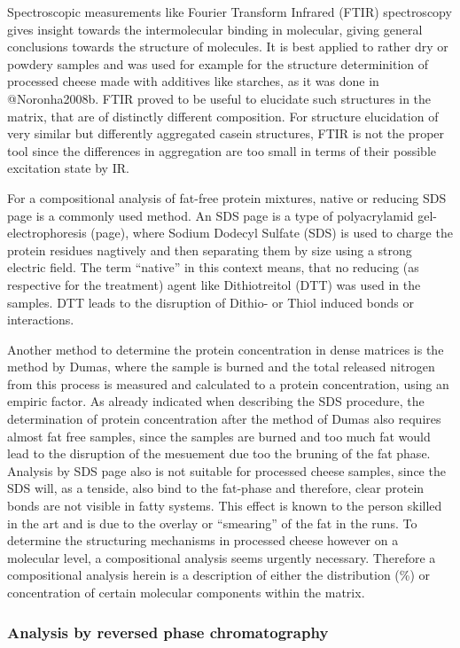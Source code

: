 \documentclass[
]{article}
\begin{document}
Spectroscopic measurements like Fourier Transform Infrared (FTIR)
spectroscopy gives insight towards the intermolecular binding in
molecular, giving general conclusions towards the structure of
molecules. It is best applied to rather dry or powdery samples and was
used for example for the structure determinition of processed cheese
made with additives like starches, as it was done in @Noronha2008b. FTIR
proved to be useful to elucidate such structures in the matrix, that are
of distinctly different composition. For structure elucidation of very
similar but differently aggregated casein structures, FTIR is not the
proper tool since the differences in aggregation are too small in terms
of their possible excitation state by IR.

For a compositional analysis of fat-free protein mixtures, native or
reducing SDS page is a commonly used method. An SDS page is a type of
polyacrylamid gel-electrophoresis (page), where Sodium Dodecyl Sulfate
(SDS) is used to charge the protein residues nagtively and then
separating them by size using a strong electric field. The term
``native'' in this context means, that no reducing (as respective for
the treatment) agent like Dithiotreitol (DTT) was used in the samples.
DTT leads to the disruption of Dithio- or Thiol induced bonds or
interactions.

Another method to determine the protein concentration in dense matrices
is the method by Dumas, where the sample is burned and the total
released nitrogen from this process is measured and calculated to a
protein concentration, using an empiric factor. As already indicated
when describing the SDS procedure, the determination of protein
concentration after the method of Dumas also requires almost fat free
samples, since the samples are burned and too much fat would lead to the
disruption of the mesuement due too the bruning of the fat phase.
Analysis by SDS page also is not suitable for processed cheese samples,
since the SDS will, as a tenside, also bind to the fat-phase and
therefore, clear protein bonds are not visible in fatty systems. This
effect is known to the person skilled in the art and is due to the
overlay or ``smearing'' of the fat in the runs. To determine the
structuring mechanisms in processed cheese however on a molecular level,
a compositional analysis seems urgently necessary. Therefore a
compositional analysis herein is a description of either the
distribution (\%) or concentration of certain molecular components
within the matrix.

\subsubsection{Analysis by reversed phase chromatography}
\end{document}
